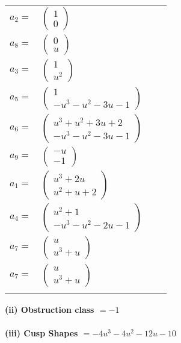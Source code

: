 \documentclass[1p]{elsarticle_modified}
\theoremstyle{definition}
\begin{document}
\begin{tabular}{m{7pt} m{180pt} m{7pt} m{180pt} }
\flushright $a_{2}=$&$\begin{pmatrix}1\\0\end{pmatrix}$ \\
\flushright $a_{8}=$&$\begin{pmatrix}0\\u\end{pmatrix}$ \\
\flushright $a_{3}=$&$\begin{pmatrix}1\\u^2\end{pmatrix}$ \\
\flushright $a_{5}=$&$\begin{pmatrix}1\\- u^3- u^2-3 u-1\end{pmatrix}$ \\
\flushright $a_{6}=$&$\begin{pmatrix}u^3+u^2+3 u+2\\- u^3- u^2-3 u-1\end{pmatrix}$ \\
\flushright $a_{9}=$&$\begin{pmatrix}- u\\-1\end{pmatrix}$ \\
\flushright $a_{1}=$&$\begin{pmatrix}u^3+2 u\\u^2+u+2\end{pmatrix}$ \\
\flushright $a_{4}=$&$\begin{pmatrix}u^2+1\\- u^3- u^2-2 u-1\end{pmatrix}$ \\
\flushright $a_{7}=$&$\begin{pmatrix}u\\u^3+u\end{pmatrix}$\\ \flushright $a_{7}=$&$\begin{pmatrix}u\\u^3+u\end{pmatrix}$\\&\end{tabular}
\flushleft \textbf{(ii) Obstruction class $= -1$}\\~\\
\flushleft \textbf{(iii) Cusp Shapes $= -4 u^3-4 u^2-12 u-10$}\\~\\
\end{document}

